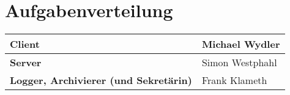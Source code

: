 \section{Aufgabenverteilung}

\begin{tabular}{l|l}
	\bf{Client} & Michael Wydler \\ \hline
	\bf{Server} & Simon Westphahl \\ \hline
	\bf{Logger, Archivierer} (und Sekretärin) & Frank Klameth \\
\end{tabular}